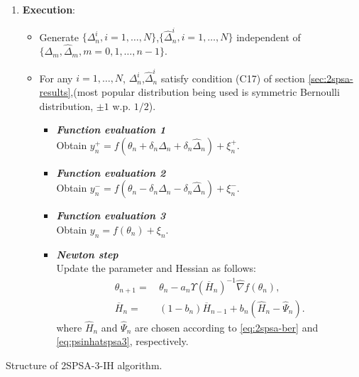 \begin{algorithm}[!htp]

\begin{enumerate}

 \item \textbf{Execution}: \\
  {
 \begin{itemize}
 \item Generate $\{\Delta_n^{i}, i=1,\ldots,N\}$,$\{\widehat\Delta_n^{i}, i=1,\ldots,N\}$ independent of $\{\Delta_m,\widehat\Delta_m, m=0,1,\ldots,n-1\}$.  
 \item For any $i=1,\ldots,N$, $\Delta_n^{i}$,$\widehat\Delta_n^{i}$  satisfy condition (C17) of section \ref{sec:2spsa-results},(most popular distribution being used is symmetric Bernoulli distribution, $\pm 1$ w.p. $1/2$).
\begin{itemize}
\item \textbf{\emph {Function evaluation 1} }\\ \hspace{4em} Obtain $y_n^+ = f(\theta_n+\delta_n \Delta_n +\delta_n \widehat\Delta_n) + \xi_n^+$.
\item \textbf{\emph {Function evaluation 2} }\\ \hspace{4em} Obtain $y_n^- = f(\theta_n -\delta_n\Delta_n-\delta_n\widehat\Delta_n) + \xi_n^-$.
\item \textbf{\emph {Function evaluation 3} }\\ \hspace{4em} Obtain $y_n = f(\theta_n) + \xi_n$.
\item \textbf{\emph {Newton step}}\\ \hspace{4.2em} Update the parameter and Hessian as follows:
\begin{align} \label{eq:2spsa-3-theta}
\theta_{n+1} = \,& \theta_n - a_n \Upsilon(\overline H_n)^{-1}\widehat\nabla f(\theta_n),\\
\overline H_n =\,& (1-b_{n})  \overline H_{n-1} + b_{n} ( \widehat H_n - \widehat \Psi_n).\label{eq:2spsa-3-ih}
\end{align}
where $\widehat H_n$ and $\widehat \Psi_n$ are chosen according to \eqref{eq:2spsa-ber} and \eqref{eq:psinhatspsa3}, respectively. 
\end{itemize}

\end{itemize}
}
\end{enumerate}

\caption{Structure of 2SPSA-3-IH algorithm.}
\label{alg:spsa-3-ih-structure}
\end{algorithm}

